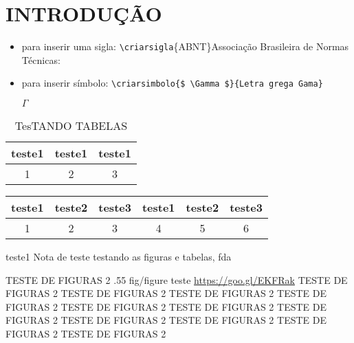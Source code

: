 \chapter[INTRODUÇÃO]{INTRODUÇÃO}


\cite{ISO5122:1979}

\textcite{ISO5122:1979}

\begin{itemize}
 \item para inserir uma sigla: 
    \verb|\criarsigla|\{ABNT\}{Associa\c{c}\~ao Brasileira de Normas T\'ecnicas}:


\item para inserir s\'imbolo: 
    \verb|\criarsimbolo{$ \Gamma $}{Letra grega Gama}|
  
    $ \Gamma $ 

\end{itemize}

\begin{table}[!ht]
 \centering
 \par\caption{TesTANDO TABELAS}

\begin{tabular}{c|c|c}
 teste1&teste1&teste1\\\hline\hline
  1&2&3\\\hline
 \end{tabular}
 \label{tab:tab01}
\end{table}



{
\begin{tabular}{c|c|c|c|c|c}
 teste1&teste2&teste3&teste1&teste2&teste3\\\hline\hline
  1&2&3&4&5&6\\\hline
 \end{tabular}
} %
{teste1} %
{\textcite{ISO5122:1979}}%
{ Nota de teste } %
{testando as figuras e tabelas, fda} %


\figura
{TESTE DE FIGURAS 2} %
{.55} %
{fig/figure} %
{\textcite[1]{abntex2modelo}} %
{teste} %
{\url{https://goo.gl/EKFRak} TESTE DE FIGURAS 2 TESTE DE FIGURAS 2 TESTE DE FIGURAS 2 TESTE DE FIGURAS 2 TESTE DE FIGURAS 2 TESTE DE FIGURAS 2 TESTE DE FIGURAS 2 TESTE DE FIGURAS 2 TESTE DE FIGURAS 2 TESTE DE FIGURAS 2 TESTE DE FIGURAS 2} %
{} %

